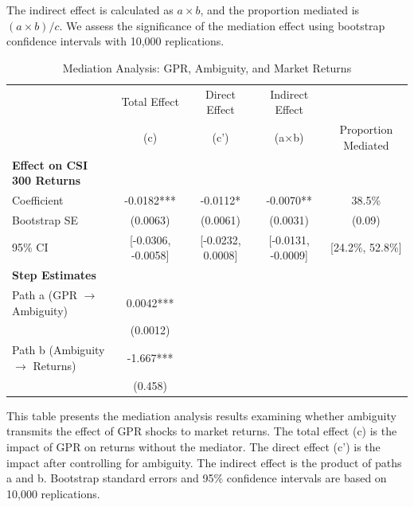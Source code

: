 \documentclass[preprint,12pt,authoryear]{elsarticle}
\begin{document}
The indirect effect is calculated as $a \times b$, and the proportion mediated is $(a \times b) / c$. We assess the significance of the mediation effect using bootstrap confidence intervals with 10,000 replications.

\begin{table}
\centering
\caption{Mediation Analysis: GPR, Ambiguity, and Market Returns}
\label{tab:mediation}
\begin{threeparttable}
\begin{tabular*}{\textwidth}{@{\extracolsep{\fill}} lcccc @{\extracolsep{\fill}}}
\toprule
& Total Effect & Direct Effect & Indirect Effect & \\
& (c) & (c') & (a$\times$b) & Proportion Mediated \\
\midrule
\midrule
\textbf{Effect on CSI 300 Returns} & & & & \\
Coefficient & -0.0182*** & -0.0112* & -0.0070** & 38.5\% \\
Bootstrap SE & (0.0063) & (0.0061) & (0.0031) & (0.09) \\
95\% CI & [-0.0306, -0.0058] & [-0.0232, 0.0008] & [-0.0131, -0.0009] & [24.2\%, 52.8\%] \\
\midrule
\textbf{Step Estimates} & & & & \\
Path a (GPR $\rightarrow$ Ambiguity) & 0.0042*** & & & \\
& (0.0012) & & & \\
Path b (Ambiguity $\rightarrow$ Returns) & -1.667*** & & & \\
& (0.458) & & & \\
\bottomrule
\end{tabular*}
\begin{tablenotes}[flushleft]
\small
\item[] This table presents the mediation analysis results examining whether ambiguity transmits the effect of GPR shocks to market returns. The total effect (c) is the impact of GPR on returns without the mediator. The direct effect (c') is the impact after controlling for ambiguity. The indirect effect is the product of paths a and b. Bootstrap standard errors and 95\% confidence intervals are based on 10,000 replications.
\end{tablenotes}
\end{threeparttable}
\end{table}
\end{document}
